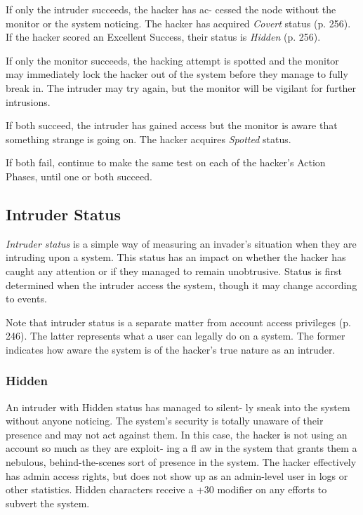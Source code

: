 If only the intruder succeeds, the hacker has ac-
cessed the node without the monitor or the system 
noticing. The hacker has acquired \textit{Covert} status (p. 
256). If the hacker scored an Excellent Success, their 
status is \textit{Hidden }(p. 256).

If only the monitor succeeds, the hacking attempt 
is spotted and the monitor may immediately lock the 
hacker out of the system before they manage to fully 
break in. The intruder may try again, but the monitor 
will be vigilant for further intrusions.

If both succeed, the intruder has gained access but 
the monitor is aware that something strange is going 
on. The hacker acquires \textit{Spotted} status.

If both fail, continue to make the same test on each 
of the hacker's Action Phases, until one or both succeed.

\subsection{Intruder Status}

\textit{Intruder status} is a simple way of measuring an 
invader's situation when they are intruding upon 
a system. This status has an impact on whether the 
hacker has caught any attention or if they managed 
to remain unobtrusive. Status is first determined when 
the intruder access the system, though it may change 
according to events.

Note that intruder status is a separate matter from 
account access privileges (p. 246). The latter represents 
what a user can legally do on a system. The former 
indicates how aware the system is of the hacker's true 
nature as an intruder.

\subsubsection{Hidden}

An intruder with Hidden status has managed to silent-
ly sneak into the system without anyone noticing. The 
system's security is totally unaware of their presence 
and may not act against them. In this case, the hacker 
is not using an account so much as they are exploit-
ing a fl aw in the system that grants them a nebulous, 
behind-the-scenes sort of presence in the system. The 
hacker effectively has admin access rights, but does 
not show up as an admin-level user in logs or other 
statistics. Hidden characters receive a +30 modifier on 
any efforts to subvert the system.

